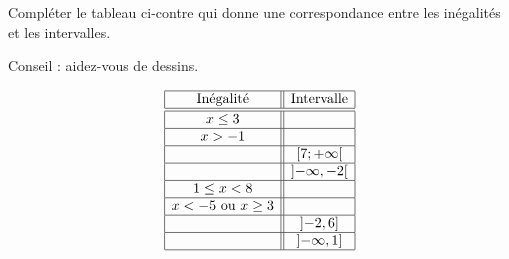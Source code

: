 
\begin{exercice}\label{exosmath-0322}

    \begin{minipage}{0.485\textwidth}
    Compléter le tableau ci-contre qui donne une correspondance entre les inégalités et les intervalles.

    Conseil : aidez-vous de dessins.
    \end{minipage}
    \begin{minipage}{0.485\textwidth}
    \begin{equation*}
        \begin{array}[]{|c||c|}
            \hline
            \text{Inégalité}&\text{Intervalle}\\
            \hline\hline
            x\leq 3&\\
            \hline
            x>-1&\\
            \hline
            &\mathopen[ 7 ; +\infty [\\
            \hline
            &\mathopen] -\infty , -2 \mathclose[\\
            \hline
            1\leq x<8&\\
            \hline
            x<-5\text{ ou }x\geq 3&\\
            \hline
            &\mathopen] -2 , 6 \mathclose]\\
            \hline
            &\mathopen] -\infty , 1 \mathclose]\\
            \hline
        \end{array}
    \end{equation*}
    \end{minipage}

\end{exercice}
